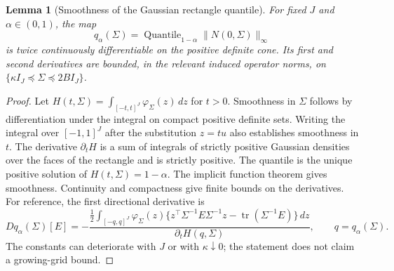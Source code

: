 \documentclass[11pt]{article}
\newtheorem{lemma}[theorem]{Lemma}
\theoremstyle{remark}\newtheorem{remark}[theorem]{Remark}
\newcommand{\tr}{\operatorname{tr}}
\begin{document}
\begin{lemma}[Smoothness of the Gaussian rectangle quantile]\label{lem:smooth}
For fixed $J$ and $\alpha\in(0,1)$, the map
\[
 q_\alpha(\Sigma)=\operatorname{Quantile}_{1-\alpha}\|N(0,\Sigma)\|_\infty
\]
is twice continuously differentiable on the positive definite cone. Its first and second derivatives are bounded, in the relevant induced operator norms, on $\{\kappa I_J\preceq\Sigma\preceq2B I_J\}$.
\end{lemma}
\begin{proof}
Let $H(t,\Sigma)=\int_{[-t,t]^J}\varphi_\Sigma(z)\,dz$ for $t>0$. Smoothness in $\Sigma$ follows by differentiation under the integral on compact positive definite sets. Writing the integral over $[-1,1]^J$ after the substitution $z=tu$ also establishes smoothness in $t$. The derivative $\partial_tH$ is a sum of integrals of strictly positive Gaussian densities over the faces of the rectangle and is strictly positive.
The quantile is the unique positive solution of $H(t,\Sigma)=1-\alpha$.
The implicit function theorem gives smoothness. Continuity and compactness give finite bounds on the derivatives. For reference, the first directional derivative is
\[
 Dq_\alpha(\Sigma)[E]
 =-\frac{\frac12\int_{[-q,q]^J}\varphi_\Sigma(z)
 \{z^\top\Sigma^{-1}E\Sigma^{-1}z-\tr(\Sigma^{-1}E)\}\,dz}
 {\partial_t H(q,\Sigma)},\qquad q=q_\alpha(\Sigma).
\]
The constants can deteriorate with $J$ or with $\kappa\downarrow0$; the statement does not claim a growing-grid bound.
\end{proof}
\end{document}
